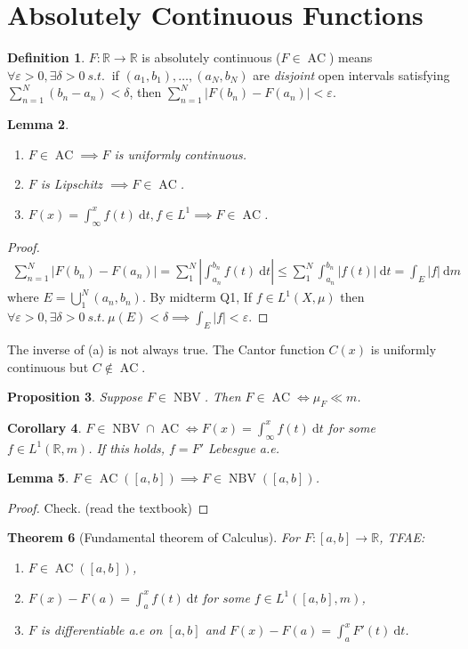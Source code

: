 \documentclass{report}
\newcommand{\R}{\mathbb{R}}
\newcommand{\st}{\ s.t.\ }
\def \NBV {\operatorname{NBV}}
\newcommand{\df}{\ \mathrm{d}}
\newtheorem{theorem}{Theorem}[chapter]
\newtheorem{corollary}[theorem]{Corollary}
\newtheorem{lemma}[theorem]{Lemma}
\newtheorem{proposition}[theorem]{Proposition}
\theoremstyle{definition}
\newtheorem{definition}[theorem]{Definition}
\theoremstyle{remark}
\begin{document}
\section{Absolutely Continuous Functions}
\def \AC {\operatorname{AC}}
\begin{definition}
	$F: \R \to \R$ is absolutely continuous ($F \in \AC$) means $\forall \varepsilon > 0, \exists \delta > 0 \st$ if $(a_1, b_1), \ldots, (a_N, b_N)$ are \emph{disjoint} open intervals satisfying $\sum_{n=1}^N(b_n - a_n) < \delta$, then $\displaystyle \sum_{n=1}^N |F(b_n) - F(a_n)| < \varepsilon$.
\end{definition}
\begin{lemma}
	\begin{enumerate}
		\item $F \in \AC \implies F$ is uniformly continuous.
		\item $F$ is Lipschitz $\implies F \in \AC$.
		\item $\displaystyle F(x) = \int_\infty^x f(t)\df t, f \in L^1 \implies F \in \AC$.
	\end{enumerate}
\end{lemma}
\begin{proof}
	\begin{align*}
		\sum_{n=1}^N |F(b_n) - F(a_n)| = \sum_{1}^N \left|\int_{a_n}^{b_n} f(t) \df t\right| \leq \sum_1^N \int_{a_n}^{b_n} |f(t)| \df t = \int_E |f| \df m
	\end{align*}
	where $E = \bigcup_{1}^N (a_n, b_n)$.
	By midterm Q1, If $f \in L^1(X, \mu)$ then $\forall \varepsilon > 0, \exists \delta > 0 \st \mu(E) < \delta \implies \int_E |f| < \varepsilon$.
\end{proof}
The inverse of (a) is not always true. The Cantor function $C(x)$ is uniformly continuous but $C \notin \AC$.

\begin{proposition}
	Suppose $F \in \NBV$. Then $F \in \AC \iff \mu_F \ll m$.
\end{proposition}
\begin{corollary}
	$F \in \NBV \cap \AC \iff \displaystyle F(x) = \int_\infty^x f(t)\df t$ for some $f \in L^1(\R, m)$. If this holds, $f = F'$ Lebesgue a.e.
\end{corollary}
\begin{lemma}
	$F \in \AC([a, b]) \implies F \in \NBV([a, b])$.
\end{lemma}
\begin{proof}
	Check. (read the textbook)
\end{proof}
\begin{theorem}[Fundamental theorem of Calculus]
	For $F: [a, b] \to \R$, TFAE: \begin{enumerate}
		\item $F \in \AC([a, b])$,
		\item $\displaystyle F(x) - F(a) = \int_a^x f(t) \df t$ for some $f \in L^1([a, b], m)$,
		\item $F$ is differentiable a.e on $[a, b]$ and $F(x) - F(a) = \int_a^x F'(t) \df t$.
	\end{enumerate}
\end{theorem}
\end{document}
